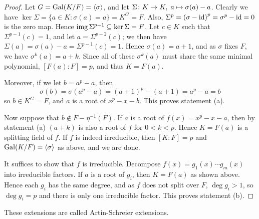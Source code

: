 \begin{proof}
    Let \(G = \operatorname{Gal}(K/F) = \left\langle\sigma\right\rangle\), and let \(\Sigma\colon K\to K,\;a\mapsto\sigma(a)-a\).
    Clearly we have \(\ker\Sigma = \{a \in K: \sigma(a) = a\} = K^G = F\).
    Also, \(\Sigma^p = {(\sigma-\operatorname{id})}^p = \sigma^p - \operatorname{id} = 0\) is the zero map.
    Hence \(\operatorname{img}\Sigma^{p-1} \subseteq \ker\Sigma = F\).
    Let \(c \in K\) such that \(\Sigma^{p-1}(c) = 1\), and let \(a = \Sigma^{p-2}(c)\);
    we then have \(\Sigma(a) = \sigma(a) - a = \Sigma^{p-1}(c) = 1\).
    Hence \(\sigma(a) = a + 1\), and as \(\sigma\) fixes \(F\), we have \(\sigma^k(a) = a + k\).
    Since all of these \(\sigma^k(a)\) must share the same minimal polynomial,
    \([F(a):F] = p\), and thus \(K = F(a)\).

    Moreover, if we let \(b = a^p - a\), then
    \begin{equation*}
        \sigma(b) = \sigma(a^p - a) = {(a+1)}^p - (a+1) = a^p - a = b
    \end{equation*}
    so \(b \in K^G = F\), and \(a\) is a root of \(x^p - x - b\).
    This proves statement (a).

    \medskip

    Now suppose that \(b \notin F - \eta^{-1}(F)\).
    If \(a\) is a root of \(f(x) = x^p - x - a\),
    then by statement (a) \((a+k)\) is also a root of \(f\) for \(0 < k < p\).
    Hence \(K = F(a)\) is a splitting field of \(f\).
    If \(f\) is indeed irreducible, then \([K:F] = p\) and \(\operatorname{Gal}(K/F) = \left\langle\sigma\right\rangle\) as above,
    and we are done.

    It suffices to show that \(f\) is irreducible.
    Decompose \(f(x) = g_1(x) \cdots g_m(x)\) into irreducible factors.
    If \(a\) is a root of \(g_i\), then \(K = F(a)\) as shown above.
    Hence each \(g_i\) has the same degree, and as \(f\) does not split over \(F\),
    \(\deg g_i > 1\), so \(\deg g_i = p\) and there is only one irreducible factor.
    This proves statement (b).
\end{proof}
\begin{remark}
    These extensions are called Artin-Schreier extensions.
\end{remark}

